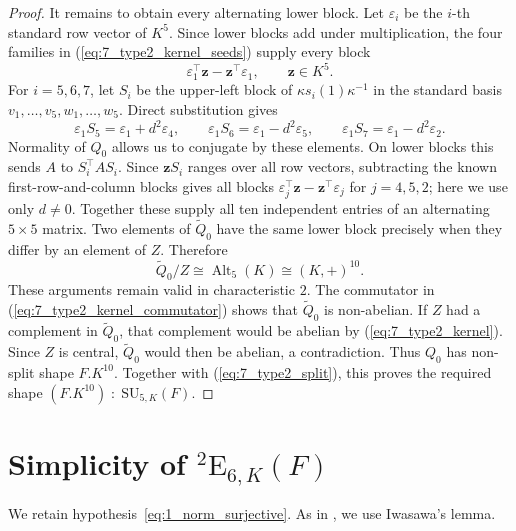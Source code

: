 \documentclass{amsart}
\def\cn{\mathord{{\;\!{:}\;\!}}}
\newcommand{\SU}{\mathrm{SU}}
\newcommand{\E}{\mathrm{E}}
\newcommand{\T}{\top}
\theoremstyle{plain}
\numberwithin{theorem}{section}
\theoremstyle{definition}
\begin{document}
\begin{proof}
	It remains to obtain every alternating lower block.  Let $\varepsilon_i$
	be the $i$-th standard row vector of $K^5$.  Since lower blocks add under
	multiplication, the four families in (\ref{eq:7_type2_kernel_seeds})
	supply every block
	\begin{equation*}
		\varepsilon_1^{\T}\mathbf z-\mathbf z^{\T}\varepsilon_1,
		\qquad\mathbf z\in K^5.
	\end{equation*}
	For $i=5,6,7$, let $S_i$ be the upper-left block of
	$\kappa s_i(1)\kappa^{-1}$ in the standard basis
	$v_1,\ldots,v_5,w_1,\ldots,w_5$.  Direct substitution gives
	\begin{equation*}
		\varepsilon_1S_5=\varepsilon_1+d^2\varepsilon_4,\qquad
		\varepsilon_1S_6=\varepsilon_1-d^2\varepsilon_5,\qquad
		\varepsilon_1S_7=\varepsilon_1-d^2\varepsilon_2.
	\end{equation*}
	Normality of $Q_0$ allows us to conjugate by these elements.  On lower
	blocks this sends $A$ to $S_i^{\T}AS_i$.  Since $\mathbf zS_i$ ranges over
	all row vectors, subtracting the known first-row-and-column blocks gives
	all blocks $\varepsilon_j^{\T}\mathbf z-\mathbf z^{\T}\varepsilon_j$
	for $j=4,5,2$; here we use only $d\neq0$.  Together these supply all ten
	independent entries of an alternating $5\times5$ matrix.  Two elements of
	$\widetilde Q_0$ have the same lower block precisely when they differ by
	an element of $Z$.  Therefore
	\begin{equation}
		\label{eq:7_type2_kernel}
		\widetilde Q_0/Z\cong\operatorname{Alt}_5(K)\cong(K,+)^{10}.
	\end{equation}
	These arguments remain valid in characteristic $2$.
	The commutator in (\ref{eq:7_type2_kernel_commutator}) shows that
	$\widetilde Q_0$ is non-abelian.  If $Z$ had a complement in
	$\widetilde Q_0$, that complement would be abelian by
	(\ref{eq:7_type2_kernel}).  Since $Z$ is central, $\widetilde Q_0$ would
	then be abelian, a contradiction.  Thus $Q_0$ has non-split shape
	$F.K^{10}$.  Together with (\ref{eq:7_type2_split}), this proves the
	required shape $(F.K^{10})\cn\SU_{5,K}(F)$.

\end{proof}

\section{Simplicity of ${}^2\E_{6,K}(F)$}
\label{section:simplicity}

We retain hypothesis~\eqref{eq:1_norm_surjective}. As in
\cite[Section~10]{BSW1}, we use Iwasawa's lemma.
\end{document}
